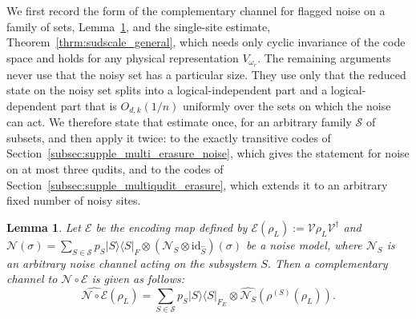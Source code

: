 \documentclass[11pt,letterpaper]{article}
\theoremstyle{plain}
\theoremstyle{plain}
\theoremstyle{plain}
\theoremstyle{plain}
\theoremstyle{plain}
\theoremstyle{plain}
\theoremstyle{plain}
\newtheorem{smlemma}[smtheorem]{Lemma}
\theoremstyle{definition}
\theoremstyle{plain}
\begin{document}
We first record the form of the complementary channel for flagged noise on a family of sets, Lemma~\ref{lem:dual_to_arb}, and the single-site estimate, Theorem~\ref{thrm:sudscale_general}, 
which needs only cyclic invariance of the code space and holds for any physical representation $V_{\omega_r}$. 
The remaining arguments never use that the noisy set has a particular size. 
They use only that the reduced state on the noisy set splits into a logical-independent part and a logical-dependent part that is $O_{d,k}(1/n)$ 
uniformly over the sets on which the noise can act. We therefore state that estimate once, for an arbitrary family $\mathcal S$ of subsets, 
and then apply it twice: to the exactly transitive codes of Section~\ref{subsec:supple_multi_erasure_noise}, which gives the statement for noise on at most three qudits, and to the codes of 
Section~\ref{subsec:supple_multiqudit_erasure}, which extends it to an arbitrary fixed number of noisy sites.

\begin{smlemma}\label{lem:dual_to_arb}
    Let $\mathcal{E}$ be the encoding map defined by $\mathcal{E}(\rho_L):=\mathcal{V}\rho_L \mathcal{V}^{\dagger}$ and
    $
        \mathcal N(\sigma)
        =
        \sum_{S\in\mathcal S}
        p_S
        |S\rangle\langle S|_F
        \otimes
        \left(\mathcal N_S\otimes \mathrm{id}_{\hat S}\right)(\sigma)
    $
    be a noise model, where $\mathcal{N}_S$ is an arbitrary noise channel acting on the subsystem $S$. 
    Then a complementary channel to $\mathcal{N}\circ \mathcal{E}$ is given as follows:
    \[
        \widehat{\mathcal{N} \circ \mathcal{E}}\left(\rho_L\right)
        =
        \sum_{S\in\mathcal S}
        p_S
        |S\rangle\langle S|_{F_E}
        \otimes
        \widehat{\mathcal{N}_S}\left(\rho^{(S)}\left(\rho_L\right)\right).
    \]
\end{smlemma}
\end{document}
